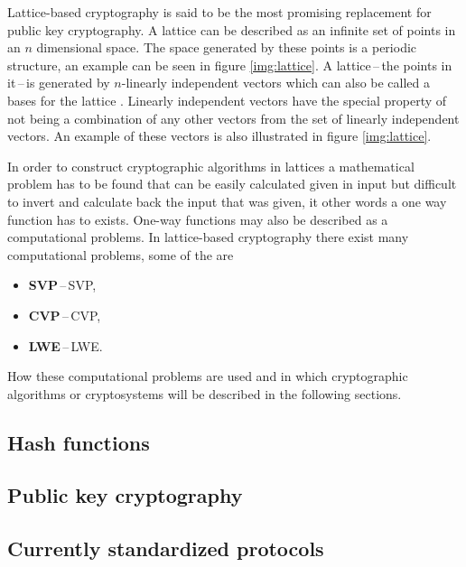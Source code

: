 Lattice-based cryptography is said to be the most promising replacement for public key cryptography. A lattice can be described as an infinite set of points in an $n$ dimensional space. The space generated by these points is a periodic structure, an example can be seen in figure \ref{img:lattice}. A lattice\,--\,the points in it\,--\,is generated by $n$-linearly independent vectors which can also be called a bases for the lattice \cite{Bernstein2009}. Linearly independent vectors have the special property of not being a combination of any other vectors from the set of linearly independent vectors. An example of these vectors is also illustrated in figure \ref{img:lattice}.


In order to construct cryptographic algorithms in lattices a mathematical problem has to be found that can be easily calculated given in input but difficult to invert and calculate back the input that was given, it other words a one way function has to exists. One-way functions may also be described as a computational problems. In lattice-based cryptography there exist many computational problems, some of the are
\begin{itemize}
  \item \textbf{SVP}\,--\,\acl{SVP},
  \item \textbf{CVP}\,--\,\acl{CVP},
  \item \textbf{LWE}\,--\,\acl{LWE}\cite{Bernstein2009}.
\end{itemize}
How these computational problems are used and in which cryptographic algorithms or cryptosystems will be described in the following sections.

\subsection{Hash functions}

\subsection{Public key cryptography}

\subsection{Currently standardized protocols}

